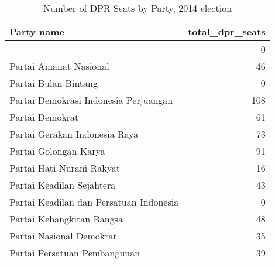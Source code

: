 
\begin{longtable}[t]{lr}
\caption{Number of DPR Seats by Party, 2014 election}\\
\toprule
Party name & total\_dpr\_seats\\
\midrule
 & 0\\
Partai Amanat Nasional & 46\\
Partai Bulan Bintang & 0\\
Partai Demokrasi Indonesia Perjuangan & 108\\
Partai Demokrat & 61\\
\addlinespace
Partai Gerakan Indonesia Raya & 73\\
Partai Golongan Karya & 91\\
Partai Hati Nurani Rakyat & 16\\
Partai Keadilan Sejahtera & 43\\
Partai Keadilan dan Persatuan Indonesia & 0\\
\addlinespace
Partai Kebangkitan Bangsa & 48\\
Partai Nasional Demokrat & 35\\
Partai Persatuan Pembangunan & 39\\
\bottomrule
\end{longtable}
